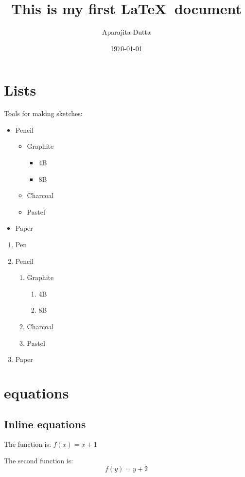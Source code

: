 \documentclass[12pt]{article}
\begin{document}
	\title{ This is my first \LaTeX \ document}
	\author{Aparajita Dutta}
	\date{\today}
\maketitle
\tableofcontents
\newpage
\section{Lists}
	Tools for making sketches:
	
\begin{itemize}
	\item Pencil
	\begin{itemize}
		\item Graphite
		\begin{itemize}
			\item 4B
			\item 8B
		\end{itemize}
		\item Charcoal
		\item Pastel
	\end{itemize}
	\item Paper
\end{itemize}

\begin{enumerate}
	\item Pen
	\item Pencil
	\begin{enumerate}
		\item Graphite
		\begin{enumerate}
			\item 4B
			\item 8B
		\end{enumerate}
		\item Charcoal
		\item Pastel
	\end{enumerate}
	\item Paper
\end{enumerate}

\section{equations}
\subsection{Inline equations}
The function is: $f(x) = x+1$

The second function is: $$f(y) = y+2$$
\end{document}
